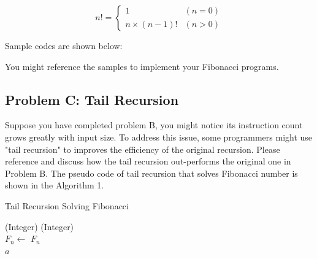 \documentclass{article}
\begin{document}
\begin{equation*}
    n! = 
    \begin{cases}
        1 & (n = 0)\\
        n\times(n-1)! & (n > 0)
    \end{cases}
\end{equation*}


Sample codes are shown below:


You might reference the samples to implement your Fibonacci programs.


\subsection{Problem C: Tail Recursion}

    Suppose you have completed problem B, you might notice its instruction count grows greatly with input size. To address this issue, some programmers might use "tail recursion" to improves the efficiency of the original recursion. Please reference \cite{tailref} and discuss how the tail recursion out-performs the original one in Problem B. The pseudo code of tail recursion that solves Fibonacci number is shown in the Algorithm 1.

\renewcommand{\algorithmicrequire}{\textbf{Input:}}
\renewcommand{\algorithmicensure}{\textbf{Output:}}

\begin{algorithm}[H]
    \caption{Tail Recursion Solving Fibonacci}
\begin{algorithmic}
    (Integer)
    (Integer) \\
    \State $F_{n} \gets $  
    \State \Return $F_{n}$ \\

         \Return $a$
        \Else {}
        \EndIf
    \EndFunction
\end{algorithmic}
\end{algorithm}


\end{document}
